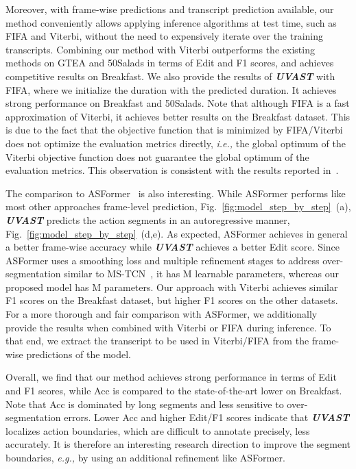 Moreover, with frame-wise predictions and transcript prediction available, our method conveniently allows applying inference algorithms at test time, such as FIFA and Viterbi, without the need to expensively iterate over the training transcripts.
Combining our method with Viterbi outperforms the existing methods on GTEA and 50Salads in terms of Edit and F1 scores, and achieves competitive results on Breakfast. We also provide the results of \textit{\textbf{UVAST}} with FIFA, where we initialize the duration with the predicted duration. It achieves strong performance on Breakfast and 50Salads. Note that although FIFA is a fast approximation of Viterbi, it achieves better results on the Breakfast dataset. This is due to the fact that the objective function that is minimized by FIFA/Viterbi does not optimize the evaluation metrics directly, \textit{i.e.,} the global optimum of the Viterbi objective function does not guarantee the global optimum of the evaluation metrics. This observation is consistent with the results reported in~\cite{fifa2021}.     

The comparison to ASFormer~\cite{asformer} is also interesting. While ASFormer performs like most other approaches frame-level prediction, Fig.~\ref{fig:model_step_by_step}~(a), \textit{\textbf{UVAST}} predicts the action segments in an autoregressive manner, Fig.~\ref{fig:model_step_by_step}~(d,e). As expected, ASFormer achieves in general a better frame-wise accuracy while \textit{\textbf{UVAST}} achieves a better Edit score. Since ASFormer uses a smoothing loss and multiple refinement stages to address over-segmentation similar to MS-TCN~\cite{farha2019ms,li2020ms}, it has M learnable parameters, whereas our proposed model has M parameters. Our approach with Viterbi achieves similar F1 scores on the Breakfast dataset, but higher F1 scores on the other datasets.    
For a more thorough and fair comparison with ASFormer, we additionally provide the results when combined with Viterbi or FIFA during inference. To that end, we extract the transcript to be used in Viterbi/FIFA from the frame-wise predictions of the model.

Overall, we find that our method achieves strong performance in terms of Edit and F1 scores, while Acc is compared to the state-of-the-art lower on Breakfast. Note that Acc is dominated by long segments and less sensitive to over-segmentation errors. Lower Acc and higher Edit/F1 scores indicate that \textit{\textbf{UVAST}} localizes action boundaries, which are difficult to annotate precisely, less accurately. It is therefore an interesting research direction to improve the segment boundaries, \textit{e.g.,} by using an additional refinement like ASFormer.      

